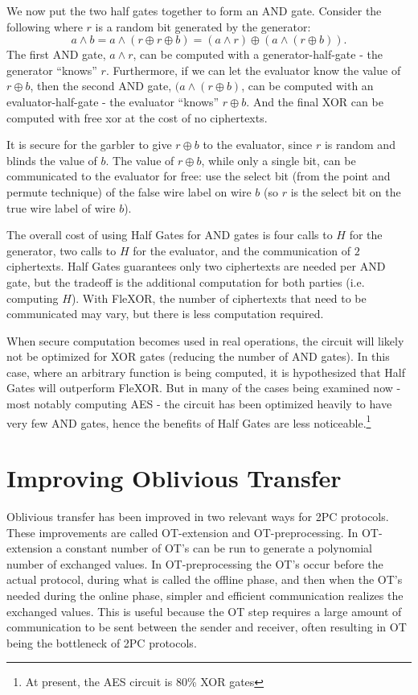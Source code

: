 We now put the two half gates together to form an AND gate. 
Consider the following where $r$ is a random bit generated by the generator:
\begin{equation}
    a \wedge b = a \wedge (r \oplus r \oplus b) = (a \wedge r) \oplus (a \wedge (r \oplus b)).
\end{equation}
The first AND gate, $a \wedge r$, can be computed with a generator-half-gate - the generator ``knows'' $r$. 
Furthermore, if we can let the evaluator know the value of $r \oplus b$, then the second AND gate, $(a \wedge (r \oplus b)$, can be computed with an evaluator-half-gate - the evaluator ``knows'' $r \oplus b$. 
And the final XOR can be computed with free xor at the cost of no ciphertexts. 

It is secure for the garbler to give $r \oplus b$ to the evaluator, since $r$ is random and blinds the value of $b$. 
The value of $r \oplus b$, while only a single bit, can be communicated to the evaluator for free: use the select bit (from the point and permute technique) of the false wire label on wire $b$ (so $r$ is the select bit on the true wire label of wire $b$).

The overall cost of using Half Gates for AND gates is four calls to $H$ for the generator, two calls to $H$ for the evaluator, and the communication of $2$ ciphertexts. 
Half Gates guarantees only two ciphertexts are needed per AND gate, but the tradeoff is the additional computation for both parties (i.e. computing $H$).
With FleXOR, the number of ciphertexts that need to be communicated may vary, but there is less computation required.

When secure computation becomes used in real operations, the circuit will likely not be optimized for XOR gates (reducing the number of AND gates). 
In this case, where an arbitrary function is being computed, it is hypothesized that Half Gates will outperform FleXOR. 
But in many of the cases being examined now - most notably computing AES - the circuit has been optimized heavily to have very few AND gates, hence the benefits of Half Gates are less noticeable.\footnote{At present, the AES circuit is 80\% XOR gates} 

\section{Improving Oblivious Transfer}
Oblivious transfer has been improved in two relevant ways for 2PC protocols. 
These improvements are called OT-extension and OT-preprocessing. 
In OT-extension a constant number of OT's can be run to generate a polynomial number of exchanged values.
In OT-preprocessing the OT's occur before the actual protocol, during what is called the offline phase, and then when the OT's needed during the online phase, simpler and efficient communication realizes the exchanged values.
This is useful because the OT step requires a large amount of communication to be sent between the sender and receiver, often resulting in OT being the bottleneck of 2PC protocols.

